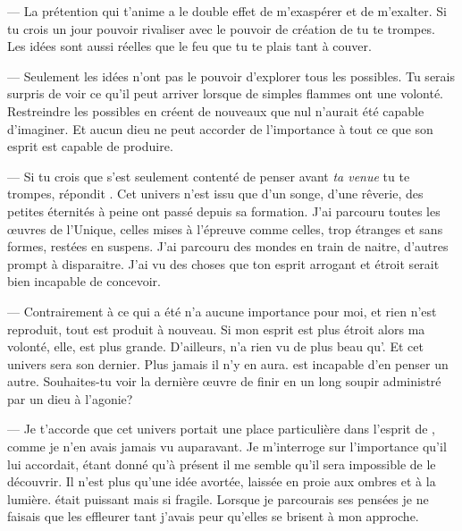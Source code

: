 --- La prétention qui t'anime a le double effet de m'exaspérer et de m'exalter. Si tu crois un jour pouvoir rivaliser avec le pouvoir de création de \Mey tu te trompes. Les idées sont aussi réelles que le feu que tu te plais tant à couver.

--- Seulement les idées n'ont pas le pouvoir d'explorer tous les possibles. Tu serais surpris de voir ce qu'il peut arriver lorsque de simples flammes ont une volonté. Restreindre les possibles en créent de nouveaux que nul n'aurait été capable d'imaginer. Et aucun dieu ne peut accorder de l'importance à tout ce que son esprit est capable de produire.

--- Si tu crois que \Mey s'est seulement contenté de penser avant \textit{ta venue} tu te trompes, répondit \Shuru. Cet univers n'est issu que d'un songe, d'une rêverie, des petites éternités à peine ont passé depuis sa formation. J'ai parcouru toutes les œuvres de l'Unique, celles mises à l'épreuve comme celles, trop étranges et sans formes, restées en suspens. J'ai parcouru des mondes en train de naitre, d'autres prompt à disparaitre. J'ai vu des choses que ton esprit arrogant et étroit serait bien incapable de concevoir.

--- Contrairement à \Mey ce qui a été n'a aucune importance pour moi, et rien n'est reproduit, tout est produit à nouveau. Si mon esprit est plus étroit alors ma volonté, elle, est plus grande. D'ailleurs, \Mey n'a rien vu de plus beau qu'\auga. Et cet univers sera son dernier. Plus jamais il n'y en aura. \Cind est incapable d'en penser un autre. Souhaites-tu voir la dernière œuvre de \Mey finir en un long soupir administré par un dieu à l'agonie?

--- Je t'accorde que cet univers portait une place particulière dans l'esprit de \Mey, comme je n'en avais jamais vu auparavant. Je m'interroge sur l'importance qu'il lui accordait, étant donné qu'à présent il me semble qu'il sera impossible de le découvrir. Il n'est plus qu'une idée avortée, laissée en proie aux ombres et à la lumière. \Mey était puissant mais si fragile. Lorsque je parcourais ses pensées je ne faisais que les effleurer tant j'avais peur qu'elles se brisent à mon approche.

  

